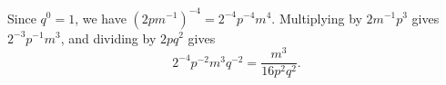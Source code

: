 Since $q^0=1$, we have $(2pm^{-1})^{-4}=2^{-4}p^{-4}m^{4}$. Multiplying by $2m^{-1}p^3$ gives $2^{-3}p^{-1}m^{3}$, and dividing by $2pq^2$ gives
\[
2^{-4}p^{-2}m^{3}q^{-2}=\boxed{\dfrac{m^3}{16p^2q^2}}.
\]
